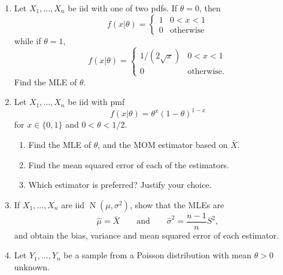 \documentclass[
]{book}
\DeclareMathOperator{\N}{N}
\theoremstyle{definition}
\theoremstyle{definition}
\theoremstyle{definition}
\theoremstyle{definition}
\theoremstyle{remark}
\begin{document}
\begin{enumerate}
\def\labelenumi{\arabic{enumi}.}
\setcounter{enumi}{5}
\item
  Let \(X_1,\dots,X_n\) be iid with one of two pdfs. If \(\theta=0\), then
  \[
  f(x|\theta) = \begin{cases}
   1 & 0<x<1 \\
   0 &\text{otherwise}
  \end{cases}
  \]
  while if \(\theta=1\),
  \[
  f(x|\theta) = \begin{cases}
   1/(2\sqrt x) & 0<x<1 \\
   0 &\text{otherwise}.
  \end{cases}
  \]
  Find the MLE of \(\theta\).
\item
  Let \(X_1,\dots,X_n\) be iid with pmf
  \[
  f(x|\theta) = \theta^x (1-\theta)^{1-x}
  \]
  for \(x\in\{0,1\}\) and \(0<\theta<1/2\).

  \begin{enumerate}
  \def\labelenumii{(\alph{enumii})}
  \item
    Find the MLE of \(\theta\), and the MOM estimator based on \(\bar X\).
  \item
    Find the mean squared error of each of the estimators.
  \item
    Which estimator is preferred? Justify your choice.
  \end{enumerate}
\item
  If \(X_1,\dots,X_n\) are iid \(\N(\mu,\sigma^2)\), show that the MLEs are
  \[
  \hat\mu =\bar X \hspace{2em}\text{and}\hspace{2em} \hat\sigma^2 = \frac{n-1}{n}S^2,
  \]
  and obtain the bias, variance and mean squared error of each estimator.
\item
  Let \(Y_1,\dots,Y_n\) be a sample from a Poisson distribution with mean \(\theta>0\) unknown.


\end{enumerate}
\end{document}
